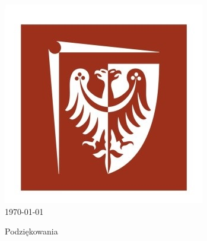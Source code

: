 \documentclass[11pt,a4paper,oldfontcommands]{memoir}
\theoremstyle{plain}
\theoremstyle{definition}
\theoremstyle{remark}
\begin{document}
\begin{center}
\includegraphics[scale=1]{OpisSystemu_IMG/pwr_logo.jpg}\\[1cm] %

{\large \today}\\[2cm] %



 

\vfill %
\end{center}






\newpage
Podziękowania 

\newpage

\tableofcontents*
 
\end{document}
